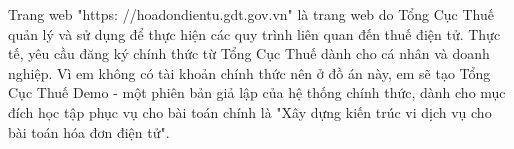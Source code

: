   

Trang web "https: //hoadondientu.gdt.gov.vn" là trang web do Tổng Cục Thuế quản lý và sử dụng để thực hiện các quy trình liên quan đến thuế điện tử. Thực tế, yêu cầu đăng ký chính thức từ Tổng Cục Thuế dành cho cá nhân và doanh nghiệp. Vì em không có tài khoản chính thức nên ở đồ án này, em sẽ tạo Tổng Cục Thuế Demo - một phiên bản giả lập của hệ thống chính thức, dành cho mục đích học tập phục vụ cho bài toán chính là "Xây dựng kiến trúc vi dịch vụ cho bài toán hóa đơn điện tử".
